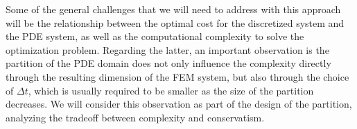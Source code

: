 \documentclass{article}
\begin{document}
Some of the general challenges that we will need to address with this approach will be
the relationship between the optimal cost for the discretized system and the PDE
system, as well as the computational complexity to solve the optimization
problem. Regarding the latter, an important observation is the partition of the
PDE domain does not only influence the complexity directly through the resulting
dimension of the FEM system, but also through the choice of $\Delta t$, which is
usually required to be smaller as the size of the partition decreases. We will
consider this observation as part of the design of the partition, analyzing the
tradeoff between complexity and conservatism.
\end{document}
